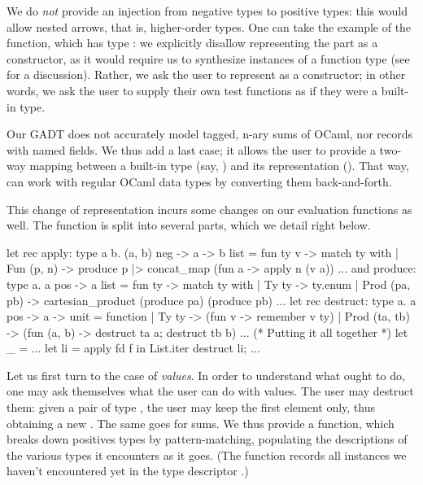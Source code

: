 We do \emph{not} provide an injection from negative types to positive types:
this would allow nested arrows, that is, higher-order types.  One can take the
example of the  function, which has type : we explicitly disallow
representing the  part as a
 constructor, as it would require us to synthesize instances of a
function type (see  for a discussion).
Rather, we ask the user to represent  as a  constructor;
in other words, we ask the user to supply their own test functions as if they
were a built-in type.

Our GADT does not accurately model tagged, n-ary sums of OCaml, nor records with
named fields. We thus add a last  case; it allows the user to
provide a two-way mapping between a built-in type (say, ) and
its \arti representation (). That way, \arti can work with regular
OCaml data types by converting them back-and-forth.

This change of representation incurs some changes on our evaluation functions
as well. The  function is split into several parts, which we detail
right below.
%
\begin{ocamlcode}
let rec apply: type a b. (a, b) neg -> a -> b list =
  fun ty v -> match ty with
  | Fun (p, n) ->
      produce p |> concat_map (fun a -> apply n (v a))
  ...
and produce: type a. a pos -> a list =
  fun ty -> match ty with
  | Ty ty -> ty.enum
  | Prod (pa, pb) ->
      cartesian_product (produce pa) (produce pb)
  ...
let rec destruct: type a. a pos -> a -> unit =
  function
  | Ty ty -> (fun v ->
      remember v ty)
  | Prod (ta, tb) -> (fun (a, b) ->
      destruct ta a; destruct tb b)
  ...
(* Putting it all together *)
let _ = ...
  let li = apply fd f in
  List.iter destruct li; ...
\end{ocamlcode}
%
Let us first turn to the case of \emph{values}. In order to understand what \arti
ought to do, one may ask themselves what the user can do with values. The user
may destruct them: given a pair of type , the user may keep
the first element only, thus obtaining a new . The same goes for sums. We
thus provide a  function, which breaks down positives types by
pattern-matching, populating the descriptions of the various types it encounters
as it goes. (The  function records all instances we haven't
encountered yet in the type descriptor .)

